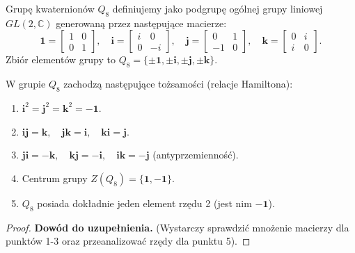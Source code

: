 \begin{definition}
    Grupę kwaternionów $Q_8$ definiujemy jako podgrupę ogólnej grupy liniowej $GL(2, \mathbb{C})$ generowaną przez następujące macierze:
    \[
        \mathbf{1} = \begin{bmatrix} 1 & 0 \\ 0 & 1 \end{bmatrix}, \quad
        \mathbf{i} = \begin{bmatrix} i & 0 \\ 0 & -i \end{bmatrix}, \quad
        \mathbf{j} = \begin{bmatrix} 0 & 1 \\ -1 & 0 \end{bmatrix}, \quad
        \mathbf{k} = \begin{bmatrix} 0 & i \\ i & 0 \end{bmatrix}.
    \]
    Zbiór elementów grupy to $Q_8 = \{ \pm \mathbf{1}, \pm \mathbf{i}, \pm \mathbf{j}, \pm \mathbf{k} \}$.
\end{definition}

\begin{proposition}
    W grupie $Q_8$ zachodzą następujące tożsamości (relacje Hamiltona):
    \begin{enumerate}
        \item $\mathbf{i}^2 = \mathbf{j}^2 = \mathbf{k}^2 = -\mathbf{1}$.
        \item $\mathbf{i}\mathbf{j} = \mathbf{k}, \quad \mathbf{j}\mathbf{k} = \mathbf{i}, \quad \mathbf{k}\mathbf{i} = \mathbf{j}$.
        \item $\mathbf{j}\mathbf{i} = -\mathbf{k}, \quad \mathbf{k}\mathbf{j} = -\mathbf{i}, \quad \mathbf{i}\mathbf{k} = -\mathbf{j}$ (antyprzemienność).
        \item Centrum grupy $Z(Q_8) = \{ \mathbf{1}, -\mathbf{1} \}$.
        \item $Q_8$ posiada dokładnie jeden element rzędu 2 (jest nim $-\mathbf{1}$).
    \end{enumerate}
\end{proposition}

\begin{proof}
    \textbf{Dowód do uzupełnienia.} (Wystarczy sprawdzić mnożenie macierzy dla punktów 1-3 oraz przeanalizować rzędy dla punktu 5).
\end{proof}

